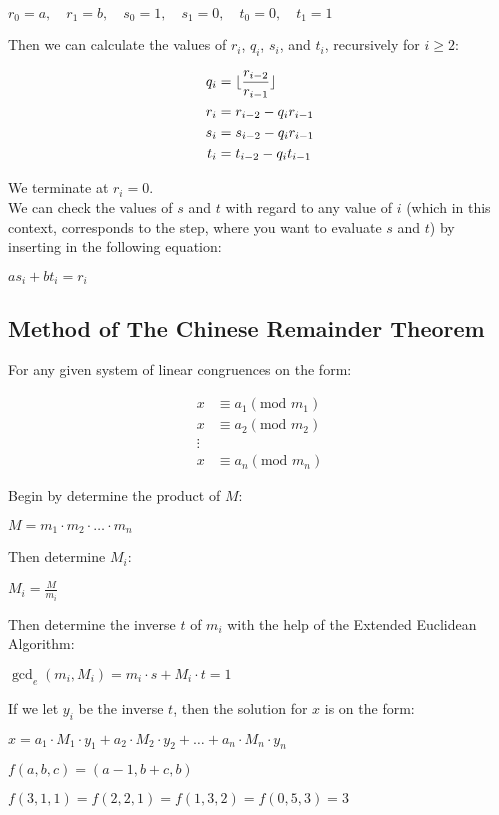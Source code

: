 \documentclass{report}
\DeclarePairedDelimiter\floor{\lfloor}{\rfloor}
\newcommand{\cent}[1]{\begin{center}#1\end{center}}
\newcommand{\mAlign}[1]{\begin{align*}#1\end{align*}}
\begin{document}
	
	\cent{$r_0 = a, \quad r_1 = b, \quad s_0 = 1, \quad s_1 = 0, \quad t_0 = 0, \quad t_1 = 1$}
	
	Then we can calculate the values of $r_i$, $q_i$, $s_i$, and $t_i$, recursively for $i \geq 2$:
	
	\mAlign{q_i &= \floor{\frac{r_{i-2}}{r_{i-1}}} \\
				  r_i &= r_{i-2} - q_i r_{i-1} \\
			  	  s_i &= s_{i-2} - q_i r_{i-1} \\
		  	  	  t_i &= t_{i-2} - q_i t_{i-1}}
	
	We terminate at $r_i = 0$.\\
	
	We can check the values of $s$ and $t$ with regard to any value of $i$ (which in this context, corresponds to the step, where you want to evaluate $s$ and $t$) by inserting in the following equation:
	
	\cent{$as_i+bt_i=r_i$}
	\subsection{Method of The Chinese Remainder Theorem}
	
	For any given system of linear congruences on the form:
	
	\mAlign{x &\equiv a_1 (\text{mod } m_1)\\
				 x &\equiv a_2(\text{mod } m_2) \\
			 	 \vdots \\
		 	  	 x &\equiv a_n(\text{mod } m_n)}
	 
	Begin by determine the product of $M$:
	 
	\cent{$M = m_1 \cdot m_2 \cdot \hdots \cdot m_n $}
	 
	Then determine $M_i$:
	
	\cent{$M_i = \frac{M}{m_i}$}
	
	Then determine the inverse $t$ of $m_i$ with the help of the Extended Euclidean Algorithm:
	
	\cent{$\gcd_e(m_i,M_i) =m_i \cdot s + M_i \cdot t= 1$}
	
	If we let $y_i$ be the inverse $t$, then the solution for $x$ is on the form:
	 
	\cent{$x = a_1\cdot M_1 \cdot y_1 + a_2\cdot M_2 \cdot y_2 + \hdots + a_n\cdot M_n \cdot y_n  $}
	
	\cent{$f(a,b,c) = (a-1,b + c,b)$}
	\cent{$f(3,1,1) = f(2,2,1) = f(1,3,2) = f(0,5,3) = 3$}
	
\end{document}
